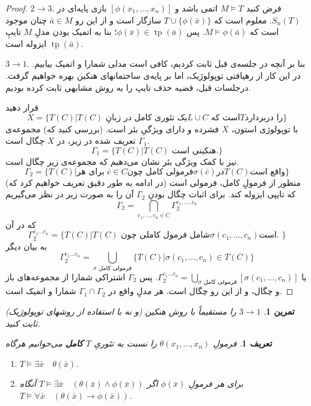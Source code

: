 \documentclass[12pt,a4paper]{report}
\theoremstyle{colorhead}
\newtheorem{tam}{تمرین}
\newtheorem{defn}[thm]{تعریف}
\DeclareMathOperator{\tp}{tp}
\begin{document}
\begin{proof}
$2\to 3$.
فرض کنید
$M\models T$
اتمی باشد و 
$[\phi(x_1,\ldots,x_n)]$
بازی پایه‌ای در
$S_n(T)$.
معلوم است که 
$T\cup \{\phi(\bar{x})\}$
سازگار است و  از این رو
$\bar{a}\in M$
چنان موجود است که
$M\models \phi(\bar{a})$.
پس
$\phi(\bar{x})\in \tp(\bar{a})$؛
بنا به اتمیک بودن مدلِ
$M$
تایپِ
$\tp(\bar{a})$
ایزوله است. 
\par 
$3\to 1$.
بنا بر آنچه در جلسه‌ی قبل ثابت کردیم، کافی است مدلی شمارا و اتمیک بیابیم. در این کار از رهیافتی توپولوژیک، اما بر پایه‌ی ساختمانهای هنکین بهره   خواهیم گرفت.    درجلسات قبل، قضیه حذف تایپ را به روش مشابهی ثابت کرده بودیم.
\par 
قرار دهید
\[
X=\{T(C)|\text{$T(C)$ یک تئوری کامل در  زبانِ
$L\cup C$ است که
$T$
را دربردارد}
\}
\]
با  توپولوژی استون،
$X$
فشرده و دارای ویژگیِ
بئر است. (بررسی کنید که)
مجموعه‌ی
$\Gamma_1$
تعریف شده در زیر، در
$X$
چگال است. 
\[
\Gamma_1=\{T(C)| \text{$T(C)$ هنکینی است.}\}
\]
نیز با کمک ویژگی بئر نشان می‌دهیم که مجموعه‌ی زیر چگال است.
\[
\Gamma_2=\{T(C)|\text{برای هر 
$\bar{c}\in C$
فرمولی کامل چون
$\sigma(\bar{c})$
در
$T(C)$
واقع است
}\}
\]
(در ادامه به طور دقیق تعریف خواهیم کرد که) منظور از فرمولِ کامل، فرمولی است که 
تایپی ایزوله کند. برای اثبات چگال بودنِ
$\Gamma_2$
آن را به صورت زیر در نظر می‌گیریم
\[
\Gamma_2=\bigcap_{c_1,\ldots, c_n\in C }\Gamma_2^{c_1,\ldots, c_n}
\]
 که در آن
 \[
 \Gamma_2^{c_1\ldots c_n}=\{T(C)| \text{$T(C)$ شامل فرمول کاملی چون
$\sigma(c_1,\ldots,c_n)$
است. 
 }
\} 
 \]
به بیان دیگر
\[
 \Gamma_2^{c_1\ldots c_n}=\bigcup_{\text{$\sigma$ فرمولی کامل}} \{T(C)|\sigma(c_1,\ldots,c_n)\in T(C)\}
\]
یا
$\Gamma_2^{c_1\ldots c_n}=\bigcup_{\text{$\sigma$ فرمولی کامل}} [\sigma(c_1,\ldots,c_n)]$.
پس
$\Gamma_2$
اشتراکی شمارا از مجموعه‌های باز و چگال، و از این رو چگال است. هر مدلِ واقع در
$\Gamma_1\cap \Gamma_2$
شمارا و اتمیک است. 
\end{proof}
\begin{tam}
$3\to 1$
را مستقیماً با روش هنکین (و نه با استفاده از روشهای توپولوژیک) ثابت کنید.
\end{tam}
\begin{defn}
فرمولِ
$\theta(x_1,\ldots,x_n)$
را نسبت به تئوریِ
$T$
\textbf{کامل}
 می‌خوانیم هرگاه 
\begin{enumerate}
\item 
$T\models \exists\bar{x}\quad \theta(\bar{x})$.
\item
برای هر فرمولِ
$\phi(\bar{x})$
اگر
$T\models \exists \bar{x}\quad (\theta(\bar{x})\wedge \phi(\bar{x}))$
آنگاه 
$T\models \forall\bar{x}\quad (\theta(\bar{x})\to \phi(\bar{x}))$.
\end{enumerate}
\end{defn}
\end{document}
